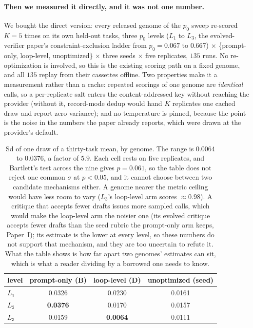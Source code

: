 \documentclass[11pt]{article}
\begin{document}
\paragraph{Then we measured it directly, and it was not one number.}
We bought the direct version: every released genome of the $p_0$ sweep re-scored $K=5$ times
on its own held-out tasks, three $p_0$ levels ($L_1$ to $L_3$, the evolved-verifier paper's
constraint-exclusion ladder from $p_0 = 0.067$ to $0.667$) $\times$ \{prompt-only, loop-level,
unoptimized\}
$\times$ three seeds $\times$ five replicates, $135$ runs. No re-optimization is involved, so
this is the existing scoring path on a fixed genome, and all $135$ replay from their cassettes
offline. Two properties make it a measurement rather than a cache: repeated scorings of one
genome are \emph{identical} calls, so a per-replicate salt enters the content-addressed key
without reaching the provider (without it, record-mode dedup would hand $K$ replicates one
cached draw and report zero variance); and no temperature is pinned, because the point is the
noise in the numbers the paper already reports, which were drawn at the provider's default.

\begin{table}[h]
\centering
\small
\begin{tabular}{lccc}
\toprule
level & prompt-only (B) & loop-level (D) & unoptimized (seed) \\
\midrule
$L_1$ & 0.0326 & 0.0230 & 0.0161 \\
$L_2$ & \textbf{0.0376} & 0.0170 & 0.0157 \\
$L_3$ & 0.0159 & \textbf{0.0064} & 0.0111 \\
\bottomrule
\end{tabular}
\caption{Sd of one draw of a thirty-task mean, by genome. The range is $0.0064$ to $0.0376$,
a factor of $5.9$. Each cell rests on five replicates, and Bartlett's test across the nine gives
$p = 0.061$, so the table does not reject one common $\sigma$ at $p<0.05$, and it cannot choose
between two candidate mechanisms either. A genome nearer the metric ceiling would have less room
to vary ($L_3$'s loop-level arm scores ${\approx}0.98$). A critique that accepts fewer drafts
issues more sampled calls, which would make the loop-level arm the noisier one (its evolved
critique accepts fewer drafts than the seed rubric the prompt-only arm keeps, Paper~I); its
estimate is the lower at every level, so these numbers do not support that mechanism, and they
are too uncertain to refute it. What the table shows is how far apart two genomes' estimates
can sit, which is what a reader dividing by a borrowed one needs to know.}
\label{tab:sigmagenome}
\end{table}
\end{document}

